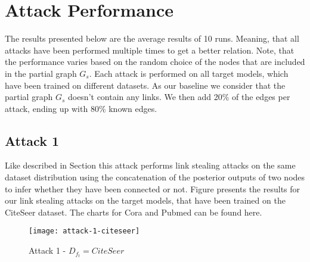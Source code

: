     \section{Attack Performance}
        The results presented below are the average results of 10 runs.
        Meaning, that all attacks have been performed multiple times to get a better relation.
        Note, that the performance varies based on the random choice of the nodes that are included in the partial graph $G_s$.
        Each attack is performed on all target models, which have been trained on different datasets.
        As our baseline we consider that the partial graph $G_s$ doesn't contain any links.
        We then add 20\% of the edges per attack, ending up with 80\% known edges.

        \subsection*{Attack 1}
            Like described in Section  this attack performs link stealing attacks on the same dataset distribution using the concatenation of the posterior outputs of two nodes to infer whether they have been connected or not. 
            Figure  presents the results for our link stealing attacks on the target models, that have been trained on the CiteSeer dataset.
            The charts for Cora and Pubmed can be found here. 

            \begin{figure}[h]
                \begin{center}
                    \texttt{[image: attack-1-citeseer]}
                    \caption{Attack 1 - $D_{f_t} = CiteSeer$}
                    \label{figure:eval-att1-citeseer}
                \end{center}
            \end{figure}

